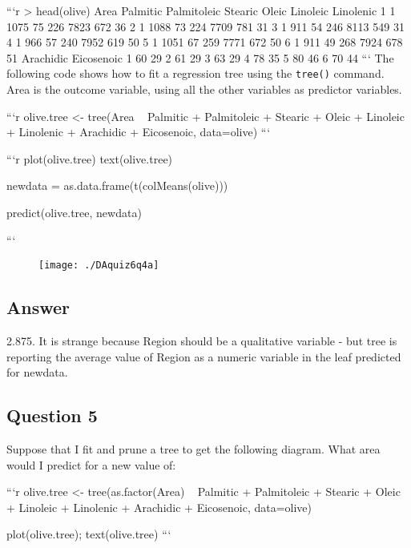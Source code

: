 ```{r}
> head(olive)
  Area Palmitic Palmitoleic Stearic Oleic Linoleic Linolenic
1    1     1075          75     226  7823      672        36
2    1     1088          73     224  7709      781        31
3    1      911          54     246  8113      549        31
4    1      966          57     240  7952      619        50
5    1     1051          67     259  7771      672        50
6    1      911          49     268  7924      678        51
  Arachidic Eicosenoic
1        60         29
2        61         29
3        63         29
4        78         35
5        80         46
6        70         44
```
The following code shows how to fit a regression tree using the \texttt{tree()} command. Area is the outcome variable, using all the other variables as predictor variables.

```{r}
olive.tree <- tree(Area ~ Palmitic + 
     Palmitoleic + Stearic + Oleic + Linoleic + 
     Linolenic + Arachidic + Eicosenoic, 
     data=olive)
```




```{r}
plot(olive.tree)
text(olive.tree)

newdata = as.data.frame(t(colMeans(olive)))

predict(olive.tree, newdata)

```

\begin{figure}
\centering
\texttt{[image: ./DAquiz6q4a]}
\caption{}
\label{fig:DAquiz6q4a}
\end{figure}
\subsection*{Answer}
2.875. It is strange because Region should be a qualitative variable - but tree is reporting the average value of Region as a numeric variable in the leaf predicted for newdata.


\subsection*{Question 5}
Suppose that I fit and prune a tree to get the following diagram. What area
would I predict for a new value of:

```{r}
olive.tree <- tree(as.factor(Area) ~ Palmitic + 
         Palmitoleic + Stearic + Oleic + Linoleic + 
         Linolenic + Arachidic + Eicosenoic, data=olive)

plot(olive.tree); text(olive.tree)
```

